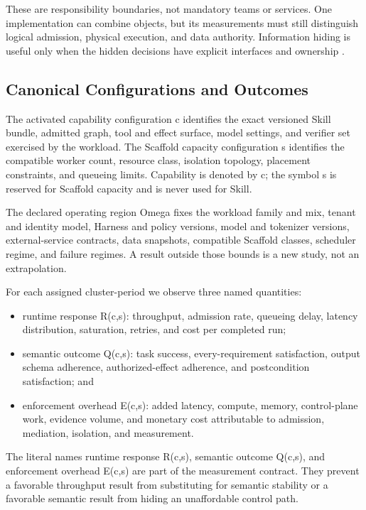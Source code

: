 These are responsibility boundaries, not mandatory teams or services. One implementation can combine objects, but its measurements must still distinguish logical admission, physical execution, and data authority. Information hiding is useful only when the hidden decisions have explicit interfaces and ownership \cite{parnas1972criteria}.

\subsection{Canonical Configurations and Outcomes}

The activated capability configuration c identifies the exact versioned Skill bundle, admitted graph, tool and effect surface, model settings, and verifier set exercised by the workload. The Scaffold capacity configuration s identifies the compatible worker count, resource class, isolation topology, placement constraints, and queueing limits. Capability is denoted by c; the symbol s is reserved for Scaffold capacity and is never used for Skill.

The declared operating region Omega fixes the workload family and mix, tenant and identity model, Harness and policy versions, model and tokenizer versions, external-service contracts, data snapshots, compatible Scaffold classes, scheduler regime, and failure regimes. A result outside those bounds is a new study, not an extrapolation.

For each assigned cluster-period we observe three named quantities:

\begin{itemize}
\item runtime response R(c,s): throughput, admission rate, queueing delay, latency distribution, saturation, retries, and cost per completed run;
\item semantic outcome Q(c,s): task success, every-requirement satisfaction, output schema adherence, authorized-effect adherence, and postcondition satisfaction; and
\item enforcement overhead E(c,s): added latency, compute, memory, control-plane work, evidence volume, and monetary cost attributable to admission, mediation, isolation, and measurement.
\end{itemize}

The literal names runtime response R(c,s), semantic outcome Q(c,s), and enforcement overhead E(c,s) are part of the measurement contract. They prevent a favorable throughput result from substituting for semantic stability or a favorable semantic result from hiding an unaffordable control path.

